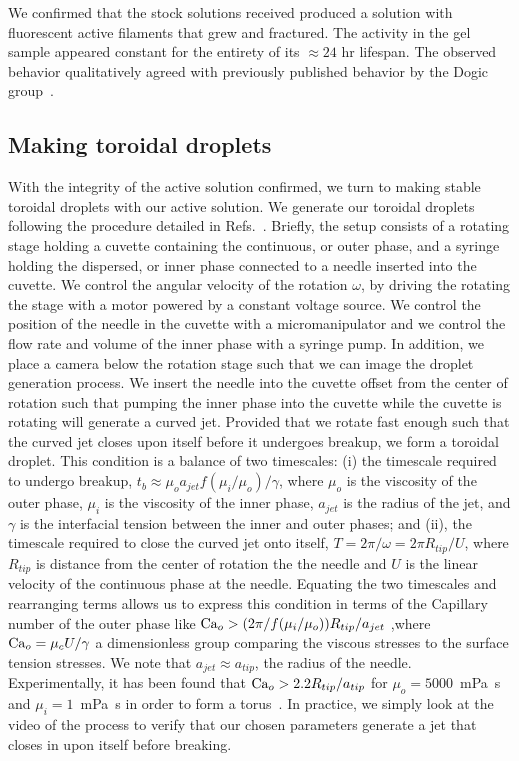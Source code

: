 We confirmed that the stock solutions received produced a solution with fluorescent active filaments that grew and fractured.
The activity in the gel sample appeared constant for the entirety of its  $\approx 24$ hr lifespan.
The observed behavior qualitatively agreed with previously published behavior by the Dogic group~\cite{RN3}.


\subsection{Making toroidal droplets}
With the integrity of the active solution confirmed, we turn to making stable toroidal droplets with our active solution.
We generate our toroidal droplets following the procedure detailed in Refs.~\cite{RN29,RN47,RN257}.
Briefly, the setup consists of a rotating stage holding a cuvette containing the continuous, or outer phase, and a syringe holding the dispersed, or inner phase connected to a needle inserted into the cuvette.
We control the angular velocity of the rotation $\omega$, by driving the rotating the stage with a motor powered by a constant voltage source.
We control the position of the needle in the cuvette with a micromanipulator and we control the flow rate and volume of the inner phase with a syringe pump.
In addition, we place a camera below the rotation stage such that we can image the droplet generation process.
We insert the needle into the cuvette offset from the center of rotation such that pumping the inner phase into the cuvette while the cuvette is rotating will generate a curved jet.
Provided that we rotate fast enough such that the curved jet closes upon itself before it undergoes breakup, we form a toroidal droplet.
This condition is a balance of two timescales: (i) the timescale required to undergo breakup, $t_b \approx \mu_o a_{jet} f(\mu_i/\mu_o)/\gamma$, where $\mu_o$ is the viscosity of the outer phase, $\mu_i$ is the viscosity of the inner phase, $a_{jet}$ is the radius of the jet, and $\gamma$ is the interfacial tension between the inner and outer phases; and (ii), the timescale required to close the curved jet onto itself, $T = 2\pi/\omega = 2 \pi R_{tip}/U$, where $R_{tip}$ is distance from the center of rotation the the needle and $U$ is the linear velocity of the continuous phase at the needle.
Equating the two timescales and rearranging terms allows us to express this condition in terms of the Capillary number of the outer phase like $\textup{Ca}_o > (2 \pi / f(\mu_i/\mu_o))R_{tip}/a_{jet}$ ,where $\textup{Ca}_o = \mu_c U/\gamma$ a dimensionless group comparing the viscous stresses to the surface tension stresses.
We note that $a_{jet} \approx a_{tip}$, the radius of the needle.
Experimentally, it has been found that $\textup{Ca}_o > 2.2 R_{tip}/a_{tip}$ for $\mu_o = 5000$~mPa~s and $\mu_i = 1$~mPa~s in order to form a torus~\cite{RN29}.
In practice, we simply look at the video of the process to verify that our chosen parameters generate a jet that closes in upon itself before breaking.\\

